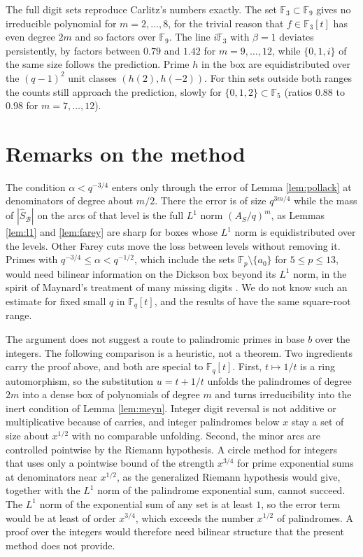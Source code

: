 \documentclass[11pt]{amsart}
\theoremstyle{definition}
\newcommand{\F}{\mathbb{F}}
\newcommand{\cB}{\mathcal{B}}
\begin{document}
The full digit sets reproduce Carlitz's numbers exactly. The set $\F_3\subset\F_9$ gives no irreducible polynomial for $m=2,\dots,8$, for the trivial reason that $f\in\F_3[t]$ has even degree $2m$ and so factors over $\F_9$. The line $i\F_3$ with $\beta=1$ deviates persistently, by factors between $0.79$ and $1.42$ for $m=9,\dots,12$, while $\{0,1,i\}$ of the same size follows the prediction. Prime $h$ in the box are equidistributed over the $(q-1)^2$ unit classes $(h(2),h(-2))$. For thin sets outside both ranges the counts still approach the prediction, slowly for $\{0,1,2\}\subset\F_5$ (ratios $0.88$ to $0.98$ for $m=7,\dots,12$).

\section{Remarks on the method}

The condition $\alpha<q^{-3/4}$ enters only through the error of Lemma \ref{lem:pollack} at denominators of degree about $m/2$. There the error is of size $q^{3m/4}$ while the mass of $|\hat S_\cB|$ on the arcs of that level is the full $L^1$ norm $(A_S/q)^m$, as Lemmas \ref{lem:l1} and \ref{lem:farey} are sharp for boxes whose $L^1$ norm is equidistributed over the levels. Other Farey cuts move the loss between levels without removing it. Primes with $q^{-3/4}\le\alpha<q^{-1/2}$, which include the sets $\F_p\setminus\{a_0\}$ for $5\le p\le13$, would need bilinear information on the Dickson box beyond its $L^1$ norm, in the spirit of Maynard's treatment of many missing digits \cite{Maynard}. We do not know such an estimate for fixed small $q$ in $\F_q[t]$, and the results of \cite{Porritt,ArevaloLalin} have the same square-root range.

The argument does not suggest a route to palindromic primes in base $b$ over the integers. The following comparison is a heuristic, not a theorem. Two ingredients carry the proof above, and both are special to $\F_q[t]$. First, $t\mapsto1/t$ is a ring automorphism, so the substitution $u=t+1/t$ unfolds the palindromes of degree $2m$ into a dense box of polynomials of degree $m$ and turns irreducibility into the inert condition of Lemma \ref{lem:meyn}. Integer digit reversal is not additive or multiplicative because of carries, and integer palindromes below $x$ stay a set of size about $x^{1/2}$ with no comparable unfolding. Second, the minor arcs are controlled pointwise by the Riemann hypothesis. A circle method for integers that uses only a pointwise bound of the strength $x^{3/4}$ for prime exponential sums at denominators near $x^{1/2}$, as the generalized Riemann hypothesis would give, together with the $L^1$ norm of the palindrome exponential sum, cannot succeed. The $L^1$ norm of the exponential sum of any set is at least $1$, so the error term would be at least of order $x^{3/4}$, which exceeds the number $x^{1/2}$ of palindromes. A proof over the integers would therefore need bilinear structure that the present method does not provide.
\end{document}
